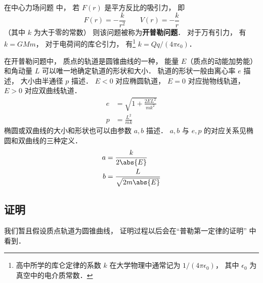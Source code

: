 
在中心力场问题 中， 若 $F(r)$ 是平方反比的吸引力， 即
\begin{equation}
F(r) = -\frac{k}{r^2}  \qquad V(r) = -\frac{k}{r}
\end{equation}
（其中 $k$ 为大于零的常数） 则该问题被称为\textbf{开普勒问题}． 对于万有引力， 有 $k = GMm$， 对于电荷间的库仑引力， 有\footnote{高中所学的库仑定律的系数 $k$ 在大学物理中通常记为 $1/(4\pi\epsilon_0)$， 其中 $\epsilon_0$ 为真空中的电介质常数．} $k = Qq/(4\pi\epsilon_0)$．

在开普勒问题中， 质点的轨道是圆锥曲线的一种， 能量 $E$（质点的动能加势能）和角动量 $L$ 可以唯一地确定轨道的形状和大小． 轨道的形状一般由离心率 $e$ 描述， 大小由半通径 $p$ 描述． $E < 0$ 对应椭圆轨道， $E = 0$ 对应抛物线轨道， $E > 0$ 对应双曲线轨道．
\begin{align}
e &= \sqrt{1 + \frac{2EL^2}{mk^2}}\label{CelBd_eq2}\\
p &= \frac{L^2}{mk}\label{CelBd_eq3}
\end{align}
椭圆或双曲线的大小和形状也可以由参数 $a,b$ 描述． $a,b$ 与 $e,p$ 的对应关系见椭圆和双曲线的三种定义．
\begin{align}
a &= \frac{k}{2\abs{E}}\label{CelBd_eq7}\\
b &= \frac{L}{\sqrt{2m\abs{E}}}\label{CelBd_eq8}
\end{align}

\subsection{证明}
我们暂且假设质点轨道为圆锥曲线， 证明过程以后会在“普勒第一定律的证明” 中看到．

